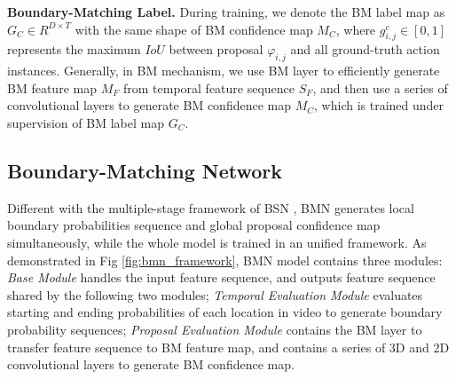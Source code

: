 \documentclass[10pt,twocolumn,letterpaper]{article}
\begin{document}
\noindent
\textbf{Boundary-Matching Label.} 
During training, we  denote the BM label map as $G_C \in R^{D\times T}$ with the same shape of BM confidence map $M_C$, where $g^c_{i,j} \in [0,1]$ represents the maximum $IoU$ between proposal $\varphi_{i,j}$ and all ground-truth action instances.
Generally, in BM mechanism, we use BM layer to efficiently generate BM feature map $M_F $ from temporal feature sequence $S_F $, and then use a series of convolutional layers to generate BM confidence map $M_C $, which is trained under supervision of BM label map $G_C$.



\subsection{Boundary-Matching Network}

Different with the multiple-stage framework of  BSN \cite{lin2018bsn}, BMN generates local boundary probabilities sequence and global proposal confidence map simultaneously, while the whole model is trained in an unified framework.
As demonstrated in Fig \ref{fig:bmn_framework}, BMN model contains three modules: \emph{Base Module } handles the input feature sequence, and outputs feature sequence shared by the following two modules; \emph{Temporal Evaluation Module } evaluates starting and ending probabilities of each location in video to generate boundary probability sequences; 
\emph{Proposal Evaluation Module } contains the BM layer to transfer feature sequence to  BM feature map, and contains a series of 3D and 2D convolutional layers to generate BM confidence map.
\end{document}
